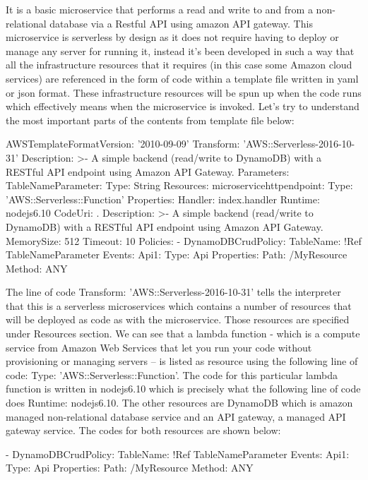 \documentclass{article}
\begin{document}
It is a basic microservice that performs a read and write to and from a non-relational database via a Restful API using amazon API gateway. This microservice is serverless by design as it does not require having to deploy or manage any server for running it, instead it’s been developed in such a way that all the infrastructure resources that it requires (in this case some Amazon cloud services) are referenced in the form of code within a template file written in yaml or json format. These infrastructure resources will be spun up when the code runs which effectively means when the microservice is invoked. Let’s try to understand the most important parts of the contents from template file below:

AWSTemplateFormatVersion: '2010-09-09'
Transform: 'AWS::Serverless-2016-10-31'
Description: >-
  A simple backend (read/write to DynamoDB) with a RESTful API endpoint using Amazon API Gateway.
Parameters: 
  TableNameParameter: 
    Type: String
Resources:
  microservicehttpendpoint:
    Type: 'AWS::Serverless::Function'
    Properties:
      Handler: index.handler
      Runtime: nodejs6.10
      CodeUri: .
      Description: >-
        A simple backend (read/write to DynamoDB) with a RESTful API endpoint using Amazon API Gateway.
      MemorySize: 512
      Timeout: 10
      Policies:
        - DynamoDBCrudPolicy:
            TableName: !Ref TableNameParameter
      Events:
        Api1:
          Type: Api
          Properties:
            Path: /MyResource
            Method: ANY

The line of code Transform: 'AWS::Serverless-2016-10-31' tells the interpreter that this is a serverless microservices which contains a number of resources that will be deployed as code as with the microservice. Those resources are specified under Resources section. We can see that a lambda function - which is a compute service from Amazon Web Services that let you run your code without provisioning or managing servers – is listed as resource using the following line of code:  
Type: 'AWS::Serverless::Function'. The code for this particular lambda function is written in nodejs6.10 which is precisely what the following line of code does Runtime: nodejs6.10. The other resources are DynamoDB which is amazon managed non-relational database service and an API gateway, a managed API gateway service. The codes for both resources are shown below:

        - DynamoDBCrudPolicy:
            TableName: !Ref TableNameParameter
      Events:
        Api1:
          Type: Api
          Properties:
            Path: /MyResource
            Method: ANY
\end{document}
